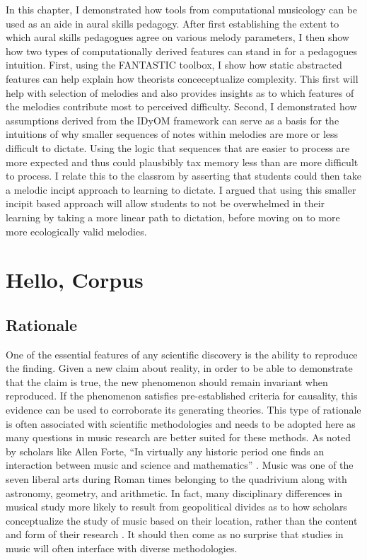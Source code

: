 \documentclass[12pt,]{book}
\begin{document}
In this chapter, I demonstrated how tools from computational musicology can be used as an aide in aural skills pedagogy.
After first establishing the extent to which aural skills pedagogues agree on various melody parameters, I then show how two types of computationally derived features can stand in for a pedagogues intuition.
First, using the FANTASTIC toolbox, I show how static abstracted features can help explain how theorists conceceptualize complexity.
This first will help with selection of melodies and also provides insights as to which features of the melodies contribute most to perceived difficulty.
Second, I demonstrated how assumptions derived from the IDyOM framework can serve as a basis for the intuitions of why smaller sequences of notes within melodies are more or less difficult to dictate.
Using the logic that sequences that are easier to process are more expected and thus could plausbibly tax memory less than are more difficult to process.
I relate this to the classrom by asserting that students could then take a melodic incipt approach to learning to dictate.
I argued that using this smaller incipit based approach will allow students to not be overwhelmed in their learning by taking a more linear path to dictation, before moving on to more more ecologically valid melodies.

\hypertarget{chapterfour}{%
\chapter{Hello, Corpus}\label{chapterfour}}

\hypertarget{rationale-3}{%
\section{Rationale}\label{rationale-3}}

One of the essential features of any scientific discovery is the ability to reproduce the finding.
Given a new claim about reality, in order to be able to demonstrate that the claim is true, the new phenomenon should remain invariant when reproduced.
If the phenomenon satisfies pre-established criteria for causality, this evidence can be used to corroborate its generating theories.
This type of rationale is often associated with scientific methodologies and needs to be adopted here as many questions in music research are better suited for these methods.
As noted by scholars like Allen Forte, ``In virtually any historic period one finds an interaction between music and science and mathematics'' \citep{forteMusicComputingPresent1967}.
Music was one of the seven liberal arts during Roman times belonging to the quadrivium along with astronomy, geometry, and arithmetic.
In fact, many disciplinary differences in musical study more likely to result from geopolitical divides as to how scholars conceptualize the study of music based on their location, rather than the content and form of their research \citep{parncuttSystematicMusicologyHistory2007}.
It should then come as no surprise that studies in music will often interface with diverse methodologies.
\end{document}
